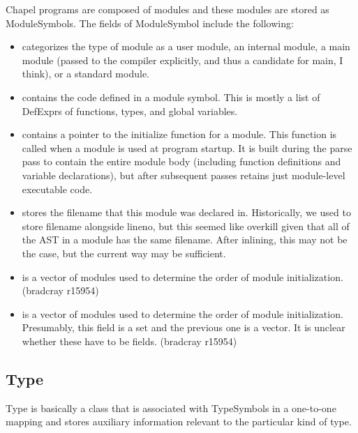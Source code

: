 \documentclass[10pt]{article}
\begin{document}
Chapel programs are composed of modules and these modules are stored
as ModuleSymbols.  The fields of ModuleSymbol include the
following:
\begin{itemize}
\item {} categorizes the type of module as a user
  module, an internal module, a main module (passed to the compiler
  explicitly, and thus a candidate for main, I think), or a standard
  module.
\item {} contains the code defined in a module
  symbol.  This is mostly a list of DefExprs of functions, types, and
  global variables.
\item {} contains a pointer to the initialize
  function for a module.  This function is called when a module is
  used at program startup.  It is built during the parse pass
  to contain the entire module body (including function definitions
  and variable declarations), but after subsequent passes retains
  just module-level executable code.
\item {} stores the filename that this module
  was declared in.  Historically, we used to store filename alongside
  lineno, but this seemed like overkill given that all of the AST in a
  module has the same filename.  After inlining, this may not be the
  case, but the current way may be sufficient.
\item {} is a vector of modules used
  to determine the order of module initialization. (bradcray r15954)
\item {} is a vector of modules used to
  determine the order of module initialization.  Presumably, this
  field is a set and the previous one is a vector.  It is unclear
  whether these have to be fields. (bradcray r15954)
\end{itemize}

\subsection{Type}

Type is basically a class that is associated with TypeSymbols in a
one-to-one mapping and stores auxiliary information relevant to the
particular kind of type.
\end{document}
